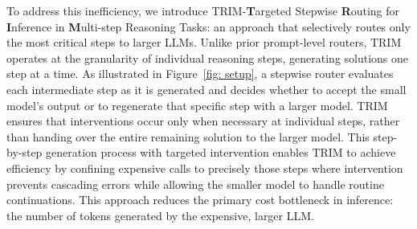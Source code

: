 \documentclass{article}
\theoremstyle{plain}
\theoremstyle{definition}
\theoremstyle{remark}
\begin{document}
To address this inefficiency, we introduce TRIM-\textbf{T}argeted Stepwise \textbf{R}outing for \textbf{I}nference in \textbf{M}ulti-step Reasoning Tasks: an approach that selectively routes only the most critical steps to larger LLMs. Unlike prior prompt-level routers, TRIM operates at the granularity of individual reasoning steps, generating solutions one step at a time. As illustrated in Figure~\ref{fig: setup}, a stepwise router evaluates each intermediate step as it is generated and decides whether to accept the small model's output or to regenerate that specific step with a larger model. TRIM ensures that interventions occur only when necessary at individual steps, rather than handing over the entire remaining solution to the larger model. This step-by-step generation process with targeted intervention enables TRIM to achieve efficiency by confining expensive calls to precisely those steps where intervention prevents cascading errors while allowing the smaller model to handle routine continuations. This approach reduces the primary cost bottleneck in inference: the number of tokens generated by the expensive, larger LLM.
\end{document}
